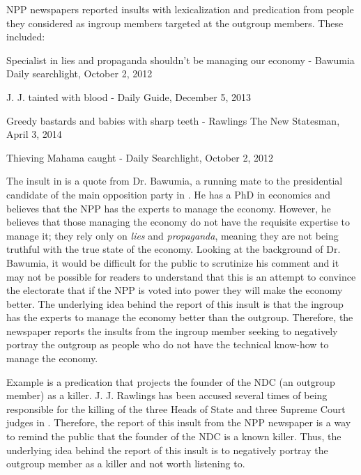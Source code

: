 \documentclass[output=paper,modfonts]{langscibook}
\begin{document}
NPP newspapers reported insults with lexicalization and predication from people they considered as ingroup members targeted at the outgroup members. These included:

\ea\label{ex:ofori:1}
\textup{Specialist in lies and propaganda shouldn’t be managing our economy} - Bawumia Daily searchlight, October 2, 2012
\z

\ea \label{ex:ofori:2}
\textup{J. J. tainted with blood} - Daily Guide, December 5, 2013\z

\ea \label{ex:ofori:3}
\textup{Greedy bastards and babies with sharp teeth} - Rawlings The New Statesman, April 3, 2014
\z

\ea \label{ex:ofori:4}
\textup{Thieving Mahama caught} - Daily Searchlight, October 2, 2012
\z

The insult in  is a quote from Dr. Bawumia, a running mate to the presidential candidate of the main opposition party in . He has a PhD in economics and believes that the NPP has the experts to manage the economy. However, he believes that those managing the economy do not have the requisite expertise to manage it; they rely only on \textit{lies} and \textit{propaganda}, meaning they are not being truthful with the true state of the economy. Looking at the background of Dr. Bawumia, it would be difficult for the public to scrutinize his comment and it may not be possible for readers to understand that this is an attempt to convince the electorate that if the NPP is voted into power they will make the economy better. The underlying idea behind the report of this insult is that the ingroup has the experts to manage the economy better than the outgroup. Therefore, the newspaper reports the insults from the ingroup member seeking to negatively portray the outgroup as people who do not have the technical know-how to manage the economy. 

Example  is a predication that projects the founder of the NDC (an outgroup member) as a killer. J. J. Rawlings has been accused several times of being responsible for the killing of the three Heads of State and three Supreme Court judges in . Therefore, the report of this insult from the NPP newspaper is a way to remind the public that the founder of the NDC is a known killer. Thus, the underlying idea behind the report of this insult is to negatively portray the outgroup member as a killer and not worth listening to.
\end{document}
